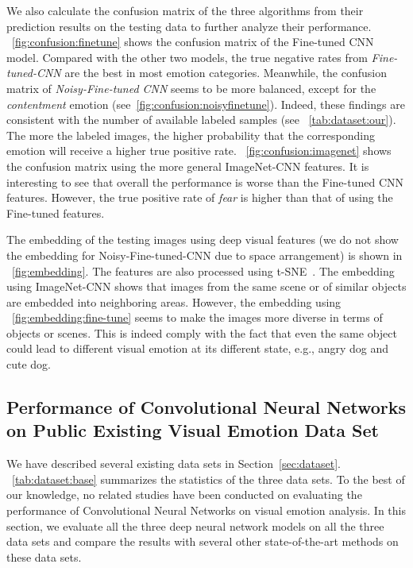 \documentclass[letterpaper]{article}
\begin{document}
We also calculate the confusion matrix of the three algorithms from their prediction results on the testing data to further analyze their performance. \figurename~\ref{fig:confusion:finetune} shows the confusion matrix of the Fine-tuned CNN model. Compared with the other two models, the true negative rates from \textit{Fine-tuned-CNN} are the best in most emotion categories. %
Meanwhile, the confusion matrix of \textit{Noisy-Fine-tuned CNN} seems to be more balanced, except for the \textit{contentment} emotion (see\figurename~\ref{fig:confusion:noisyfinetune}). Indeed, these findings are consistent with the number of available labeled samples (see \tablename~\ref{tab:dataset:our}). The more the labeled images, the higher probability that the corresponding emotion will receive a higher true positive rate. \figurename~\ref{fig:confusion:imagenet} shows the confusion matrix using the more general ImageNet-CNN features. It is interesting to see that overall the performance is worse than the Fine-tuned CNN features. However, the true positive rate of \textit{fear} is higher than that of using the Fine-tuned features. %

The embedding of the testing images using deep visual features (we do not show the embedding for Noisy-Fine-tuned-CNN due to space arrangement) is shown in \figurename~\ref{fig:embedding}. The features are also processed using t-SNE~\cite{van2008visualizing}. The embedding using ImageNet-CNN shows that images from the same scene or of similar objects are embedded into neighboring areas. However, the embedding using \figurename~\ref{fig:embedding:fine-tune} seems to make the images more diverse in terms of objects or scenes. This is indeed comply with the fact that even the same object could lead to different visual emotion at its different state, e.g., angry dog and cute dog.
\subsection{Performance of Convolutional Neural Networks on Public Existing Visual Emotion Data Set}

We have described several existing data sets in Section~\ref{sec:dataset}. \tablename~\ref{tab:dataset:base} summarizes the statistics of the three data sets. To the best of our knowledge, no related studies have been conducted on evaluating the performance of Convolutional Neural Networks on visual emotion analysis. In this section, we evaluate all the three deep neural network models on all the three data sets and compare the results with several other state-of-the-art methods on these data sets.
\end{document}
